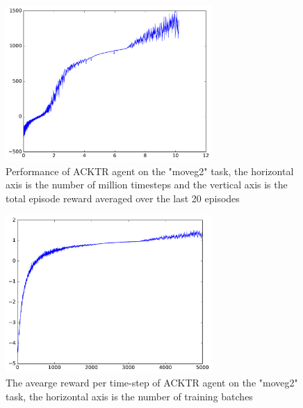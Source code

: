 \begin{figure}[!htbp]
	\includegraphics[width=0.7\textwidth]{images/rec_stat_moveg2.pdf}
	\centering
	\caption{Performance of ACKTR agent on the "moveg2" task, the horizontal axis is the number of million timesteps and the vertical axis is the total episode reward averaged over the last 20 episodes}\label{rec_stat_moveg2}
\end{figure}

\begin{figure}[!htbp]
	\includegraphics[width=0.7\textwidth]{images/rec_stat_moveg2_meanrt.pdf}
	\centering
	\caption{The avearge reward per time-step of ACKTR agent on the "moveg2" task, the horizontal axis is the number of training batches}\label{rec_stat_moveg2_meanrt}
\end{figure}

